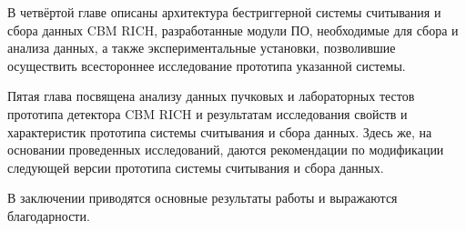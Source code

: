 В четвёртой главе описаны архитектура бестриггерной системы считывания и сбора данных CBM RICH, разработанные модули ПО, необходимые для сбора и анализа данных, а также экспериментальные установки, позволившие осуществить всестороннее исследование прототипа указанной системы.

Пятая глава посвящена анализу данных пучковых и лабораторных тестов прототипа детектора CBM RICH и результатам исследования свойств и характеристик прототипа системы считывания и сбора данных. Здесь же, на основании проведенных исследований, даются рекомендации по модификации следующей версии прототипа системы считывания и сбора данных.

В заключении приводятся основные результаты работы и выражаются благодарности.
